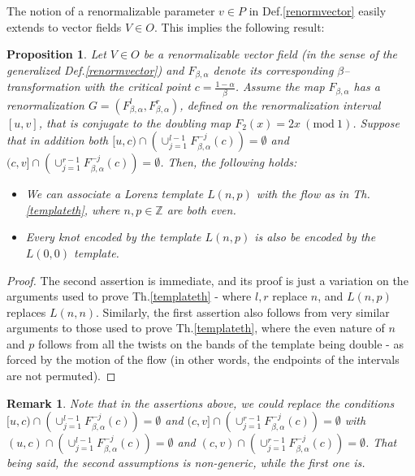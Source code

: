 \documentclass[10pt,reqno]{amsart}
\theoremstyle{plain}
\theoremstyle{assumption}
\theoremstyle{notation}
\theoremstyle{claim}
\theoremstyle{conj}
\newtheorem{remark}{\textbf{Remark}}[section]
\theoremstyle{theorem}
\theoremstyle{proposition}
\newtheorem{proposition}{Proposition}[section]
\theoremstyle{corollary}
\newcommand{\Mod}[1]{\ (\mathrm{mod}\ #1)}
\begin{document}
The notion of a renormalizable parameter $v\in P$ in Def.\ref{renormvector} easily extends to vector fields $V\in O$. This implies the following result:
\begin{proposition}
    \label{condition1} Let $V\in O$ be a renormalizable vector field (in the sense of the generalized Def.\ref{renormvector}) and $F_{\beta,\alpha}$ denote its corresponding $\beta$--transformation with the critical point $c=\frac{1-\alpha}{\beta}$. Assume the map $F_{\beta,\alpha}$ has a renormalization $G=(F^l_{\beta,\alpha},F^r_{\beta,\alpha})$, defined on the renormalization interval $[u,v]$, that is conjugate to the doubling map $F_2(x)=2x\Mod{1}$. Suppose that in addition both $[u,c)\cap(\cup_{j=1}^{l-1}F^{-j}_{\beta,\alpha}(c))=\emptyset$ and $(c,v]\cap(\cup_{j=1}^{r-1}F^{-j}_{\beta,\alpha}(c))=\emptyset$. Then, the following holds:
 
    \begin{itemize}
        \item We can associate a Lorenz template $L(n,p)$ with the flow as in Th.\ref{templateth}, where $n,p\in \mathbb{Z}$ are both even.
        \item Every knot encoded by the template $L(n,p)$ is also be encoded by the $L(0,0)$ template.


    \end{itemize}
\end{proposition}
\begin{proof}
    The second assertion is immediate, and its proof is just a variation on the arguments used to prove Th.\ref{templateth} - where $l,r$ replace $n$, and $L(n,p)$ replaces $L(n,n)$. Similarly, the first assertion also follows from very similar arguments to those used to prove Th.\ref{templateth}, where the even nature of $n$ and $p$ follows from all the twists on the bands of the template being double - as forced by the motion of the flow (in other words, the endpoints of the intervals are not permuted).
\end{proof}
\begin{remark}
    Note that in the assertions above, we could replace the conditions $[u,c)\cap(\cup_{j=1}^{l-1} F^{-j}_{\beta,\alpha}(c))=\emptyset$ and $(c,v]\cap(\cup_{j=1}^{r-1}F^{-j}_{\beta,\alpha}(c))=\emptyset$ with $(u,c)\cap(\cup_{j=1}^{l-1} F^{-j}_{\beta,\alpha}(c))=\emptyset$ and $(c,v)\cap(\cup_{j=1}^{r-1}F^{-j}_{\beta,\alpha}(c))=\emptyset$. That being said, the second assumptions is non-generic, while the first one is.
\end{remark}
\end{document}
